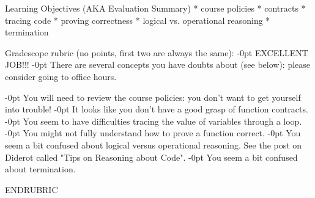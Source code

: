 \documentclass[12pt]{exam}
\begin{document}


\begin{questions}
\end{questions}

\RUBRIC

Learning Objectives (AKA Evaluation Summary)
* course policies
* contracts
* tracing code
* proving correctness
* logical vs. operational reasoning
* termination

Gradescope rubric (no points, first two are always the same):
-0pt EXCELLENT JOB!!!
-0pt There are several concepts you have doubts about (see below): please consider going to office hours.

-0pt You will need to review the course policies: you don't want to get yourself into trouble!
-0pt It looks like you don't have a good grasp of function contracts.
-0pt You seem to have difficulties tracing the value of variables through a loop.
-0pt You might not fully understand how to prove a function correct.
-0pt You seem a bit confused about logical versus operational reasoning. See the post on Diderot called "Tips on Reasoning about Code".
-0pt You seem a bit confused about termination.

ENDRUBRIC

\end{document}
